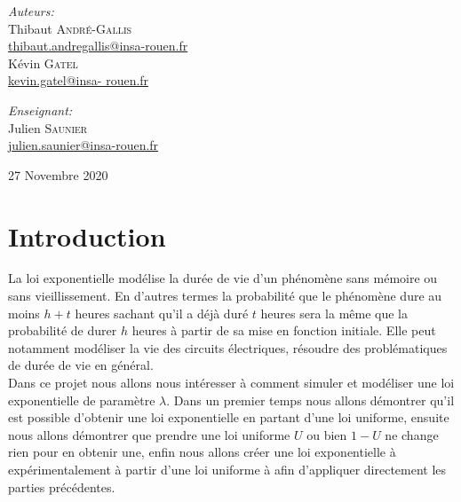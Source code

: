 \documentclass[12,french]{report}
\begin{document}
\begin{titlepage}
\begin{center}
	\begin{minipage}{0.4\textwidth}
		\begin{flushleft} \large
			\emph{Auteurs:}\\
			Thibaut \textsc{André-Gallis} \\
			{\small\href{mailto:thibaut.andregallis@insa-rouen.fr}{thibaut.andregallis@insa-rouen.fr}} \\
			Kévin \textsc{Gatel} \\
			{\small\href{mailto:kevin.gatel@insa-rouen.fr}{kevin.gatel@insa-				rouen.fr}}
		\end{flushleft}
	\end{minipage}
	\begin{minipage}{0.4\textwidth}
		\begin{flushright} \large
			\emph{Enseignant:} \\
			Julien \textsc{Saunier} \\
			{\small\href{mailto:julien.saunier@insa-rouen.fr}								{julien.saunier@insa-rouen.fr}}
		\end{flushright}
	\end{minipage}

	\vfill
	{\large 27 Novembre 2020}
\end{center}
\end{titlepage}

\tableofcontents


\renewcommand{\chaptername}{}
\chapter*{Introduction}

La loi exponentielle modélise la durée de vie d'un phénomène sans mémoire ou sans vieillissement. En d'autres termes la probabilité que le phénomène dure au moins $h+t$ heures sachant qu'il a déjà duré $t$ heures sera la même que la probabilité de durer $h$ heures à partir de sa mise en fonction initiale. Elle peut notamment modéliser la vie des circuits électriques, résoudre des problématiques de durée de vie en général.\\

Dans ce projet nous allons nous intéresser à comment simuler et modéliser une loi exponentielle de paramètre $\lambda$. Dans un premier temps nous allons démontrer qu'il est possible d'obtenir une loi exponentielle en partant d'une loi uniforme, ensuite nous allons démontrer que prendre une loi uniforme $U$ ou bien $1-U$ ne change rien pour en obtenir une, enfin nous allons créer une loi exponentielle à expérimentalement à partir d'une loi uniforme à afin d'appliquer directement les parties précédentes.
\end{document}
